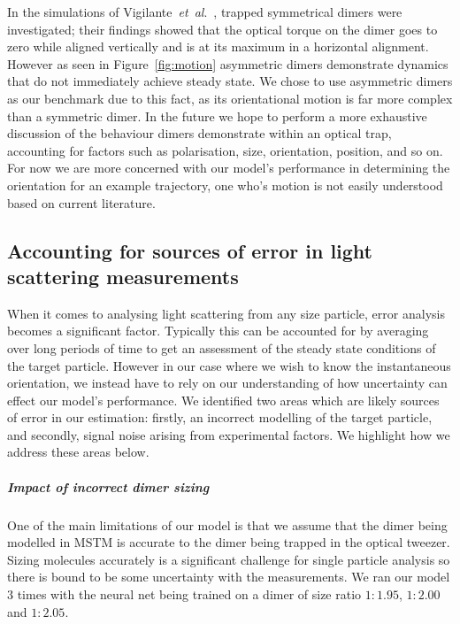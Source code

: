 \documentclass[preprint,  3p]{elsarticle}
\begin{document}
In the simulations of Vigilante~\emph{et~al}.\ \cite{Vigilante2020Brownian_OT}, trapped symmetrical dimers were investigated; their findings showed that the optical torque on the dimer goes to zero while aligned vertically and is at its maximum in a horizontal alignment. However as seen in Figure~\ref{fig:motion} asymmetric dimers demonstrate dynamics that do not immediately achieve steady state. We chose to use asymmetric dimers as our benchmark due to this fact, as its orientational motion is far more complex than a symmetric dimer. In the future we hope to perform a more exhaustive discussion of the behaviour dimers demonstrate within an optical trap, accounting for factors such as polarisation, size, orientation, position, and so on. For now we are more concerned with our model's performance in determining the orientation for an example trajectory, one who's motion is not easily understood based on current literature. 
\subsection{Accounting for sources of error in light scattering measurements}
When it comes to analysing light scattering from any size particle, error analysis becomes a significant factor. Typically this can be accounted for by averaging over long periods of time to get an assessment of the steady state conditions of the target particle. However in our case where we wish to know the instantaneous orientation, we instead have to rely on our understanding of how uncertainty can effect our model's performance. We identified two areas which are likely sources of error in our estimation: firstly, an incorrect modelling of the target particle, and secondly, signal noise arising from experimental factors. We highlight how we address these areas below. 
\subparagraph{Impact of incorrect dimer sizing}
\label{sec:lam}

One of the main limitations of our model is that we assume that the dimer being modelled in MSTM is accurate to the dimer being trapped in the optical tweezer. Sizing molecules accurately is a significant challenge for single particle analysis so there is bound to be some uncertainty with the measurements. We ran our model 3 times with the neural net being trained on a dimer of size ratio $1:1.95$, $1:2.00$ and $1:2.05$.
\end{document}
